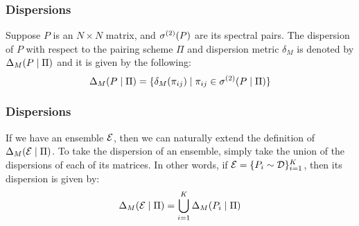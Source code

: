 \begin{frame} \frametitle{Dispersions}

\begin{alertblock}{}
Suppose $P$ is an $N \times N$ matrix, and ${\sigma^{(2)}}(P)$ are its spectral pairs.
The dispersion of $P$ with respect to the pairing scheme $\Pi$ and dispersion metric $\delta_M$ is denoted by $\Delta_M(P \mid \Pi)$ and it is given by the following:
$$\Delta_M(P \mid \Pi) = \{\delta_M({\pi_{ij}}) \mid {\pi_{ij}} \in {\sigma^{(2)}}(P \mid \Pi)\}$$
\end{alertblock}

\end{frame}

\begin{frame} \frametitle{Dispersions}

\begin{alertblock}{}
If we have an ensemble $\mathcal{E}$, then we can naturally extend the definition of $\Delta_M(\mathcal{E} \mid \Pi)$.
To take the dispersion of an ensemble, simply take the union of the dispersions of each of its matrices.
In other words, if $\mathcal{E} = \{P_i \sim \mathcal{D}\}_{i = 1}^K$, then its dispersion is given by:
$$\Delta_M(\mathcal{E} \mid \Pi) = \bigcup_{i=1}^K \Delta_M(P_i \mid \Pi)$$
\end{alertblock}

\end{frame}






